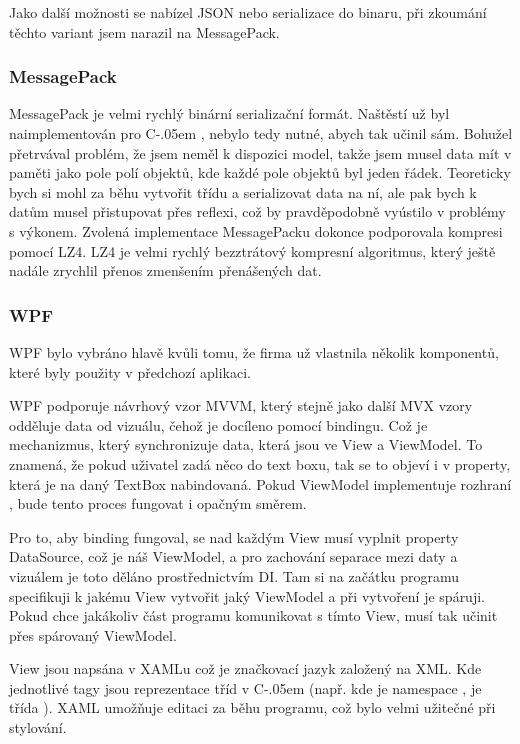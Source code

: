 \documentclass[czech,bachelor,dept460,male,csharp]{diploma}
\newcommand{\Csharp}{%
  {\settoheight{\dimen0}{C}C\kern-.05em \resizebox{!}{\dimen0}{\raisebox{\depth}{\#}}}}
\begin{document}
			Jako další možnosti se nabízel JSON nebo serializace do binaru, při zkoumání těchto variant jsem narazil na MessagePack. 
		\subsubsection{MessagePack}
			MessagePack\cite{mpSpec} je velmi rychlý binární serializační formát. Naštěstí už byl naimplementován pro {\Csharp}, nebylo tedy nutné, abych tak učinil sám. Bohužel přetrvával problém, že jsem neměl k dispozici model, takže jsem musel data mít v paměti jako pole polí objektů, kde každé pole objektů byl jeden řádek. Teoreticky bych si mohl za běhu vytvořit třídu a serializovat data na ní, ale pak bych k datům musel přistupovat přes reflexi, což by pravděpodobně vyústilo v problémy s výkonem. Zvolená implementace MessagePacku\cite{mpImpl} dokonce podporovala kompresi pomocí LZ4. LZ4\cite{l4z} je velmi rychlý bezztrátový kompresní algoritmus, který ještě nadále zrychlil přenos zmenšením přenášených dat. 
 
		\subsubsection{WPF}
			WPF bylo vybráno hlavě kvůli tomu, že firma už vlastnila několik komponentů, které byly použity v předchozí aplikaci.
			
			WPF podporuje návrhový vzor MVVM, který stejně jako další MVX vzory odděluje data od vizuálu, čehož je docíleno pomocí bindingu. Což je mechanizmus, který synchronizuje data, která jsou ve View a ViewModel. To znamená, že pokud uživatel zadá něco do text boxu, tak se to objeví i v property, která je na daný TextBox nabindovaná. Pokud ViewModel implementuje rozhraní , bude tento proces fungovat i opačným směrem.
			
			Pro to, aby binding fungoval, se nad každým View musí vyplnit property DataSource, což je náš ViewModel, a pro zachování separace mezi daty a vizuálem je toto děláno prostřednictvím DI. Tam si na začátku programu specifikuji k jakému View vytvořit jaký ViewModel a při vytvoření je spáruji. Pokud chce jakákoliv část programu komunikovat s tímto View, musí tak učinit přes spárovaný ViewModel.
			
			View jsou napsána v XAMLu což je značkovací jazyk založený na XML. Kde jednotlivé tagy jsou reprezentace tříd v {\Csharp} (např.  kde  je namespace , je třída  ). XAML umožňuje editaci za běhu programu, což bylo velmi užitečné při stylování. 
			
\end{document}
